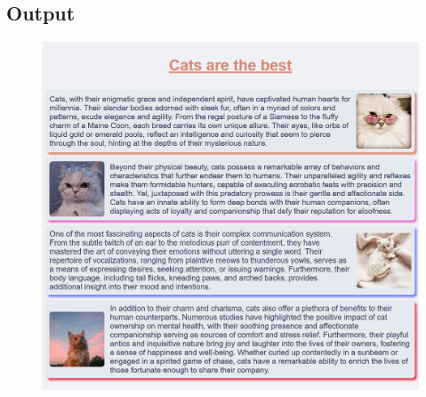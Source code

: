 \documentclass{article}
\begin{document}
    \subsection*{Output}
    \begin{figure}[h!]
    \centering
    \includegraphics[width=1.0\textwidth]{./Assets/p0301.png}
    \end{figure}
  \newpage
\end{document}
